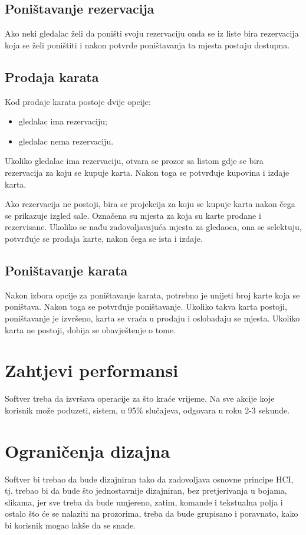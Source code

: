 \subsection{Poništavanje rezervacija}
Ako neki gledalac želi da poništi svoju rezervaciju onda se iz liste bira rezervacija koja se želi poništiti i nakon potvrde poništavanja
ta mjesta postaju dostupna.

\subsection{Prodaja karata}
Kod prodaje karata postoje dvije opcije:
\begin{itemize}
\item gledalac ima rezervaciju;
\item gledalac nema rezervaciju.
\end{itemize}

Ukoliko gledalac ima rezervaciju, otvara se prozor sa listom gdje se bira rezervacija za koju se kupuje karta. Nakon toga se potvrđuje kupovina i izdaje karta.

Ako rezervacija ne postoji, bira se projekcija za koju se kupuje karta nakon čega se prikazuje izgled sale. Označena su mjesta za koja su karte prodane i rezervisane. Ukoliko se nađu zadovoljavajuća mjesta za gledaoca, ona se selektuju, potvrđuje se prodaja karte, nakon čega se ista i izdaje.

\subsection{Poništavanje karata}
Nakon izbora opcije za poništavanje karata, potrebno je unijeti broj karte koja se poništava. Nakon toga se potvrđuje poništavanje. Ukoliko takva karta postoji, poništavanje je izvršeno, karta se vraća u prodaju i oslobađaju se mjesta. Ukoliko karta ne postoji, dobija se obavještenje o tome.

\section{Zahtjevi performansi}
Softver treba da izvršava operacije za što kraće vrijeme. Na sve akcije koje korisnik može poduzeti, sistem, u 95\% slučajeva, 
odgovara u roku 2-3 sekunde.

\section{Ograničenja dizajna}
Softver bi trebao da bude dizajniran tako da zadovoljava osnovne principe HCI,
tj. trebao bi da bude što jednostavnije dizajniran, bez pretjerivanja u bojama,
slikama, jer sve treba da bude umjereno, zatim, komande i tekstualna polja i
ostalo što će se nalaziti na prozorima, treba da bude grupisano i poravnato, kako
bi korisnik mogao lakše da se snađe.

